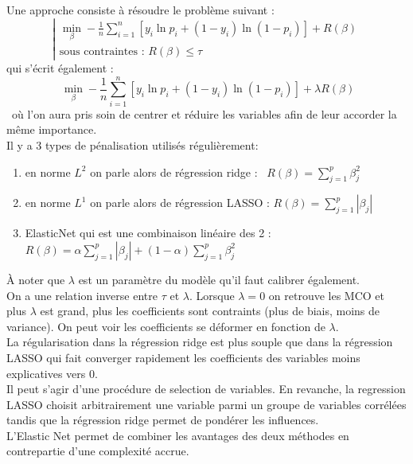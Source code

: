 \documentclass[french]{article}
\begin{document}
\begin{multicols}{2}
\noindent Une approche consiste à résoudre le problème suivant : 
\[ \left| \begin{array}{l}\displaystyle\min_{\beta}-\frac{1}{n} \sum_{i=1}^{n} \left[y_{i} \ln p_{i}+\left(1-y_{i}\right) \ln \left(1-p_{i}\right)\right] + R(\beta) \\
\text{sous contraintes : } R (\beta) \leq \tau \end{array} \right.\]
qui s'écrit également : 
\[\ \displaystyle\min_{\beta}-\frac{1}{n} \sum_{i=1}^{n} \left[y_{i} \ln p_{i}+\left(1-y_{i}\right) \ln \left(1-p_{i}\right)\right] +\lambda R(\beta) \]\
où l'on aura pris soin de centrer et réduire les variables afin de leur accorder la même importance.
\\

Il y a 3 types de pénalisation utilisés régulièrement: 
\begin{enumerate}
    \item en norme $L^{2}$ on parle alors de régression ridge  : \ $R(\beta)=\sum_{j=1}^{p}\beta_{j}^{2}$
    \item en norme $L^{1}$ on parle alors de régression LASSO  : $R(\beta)=\sum_{j=1}^{p}\left|\beta_{j}\right|$
    \item ElasticNet qui est une combinaison linéaire des 2 : $R(\beta)=\alpha \sum_{j=1}^{p}\left|\beta_{j}\right|+(1-\alpha) \sum_{j=1}^{p} \beta_{j}^{2}$
\end{enumerate}

À noter que $\lambda$ est un paramètre du modèle qu'il faut calibrer également.\\
On a une relation inverse entre $\tau$ et $\lambda$. Lorsque $\lambda=0$ on retrouve les MCO et plus $\lambda$ est grand, plus les coefficients sont contraints (plus de biais, moins de variance).
On peut voir les coefficients se déformer en fonction de $\lambda$.\\
La régularisation dans la régression ridge est plus souple que dans la régression LASSO qui fait converger rapidement les coefficients des variables moins explicatives vers 0.\\ Il peut s'agir d'une procédure de selection de variables.
En revanche, la regression LASSO choisit arbitrairement une variable parmi un groupe de variables corrélées tandis que la régression ridge permet de pondérer les influences.\\
L'Elastic Net permet de combiner les avantages des deux méthodes en contrepartie d'une complexité accrue.\\


\end{multicols}
\end{document}
